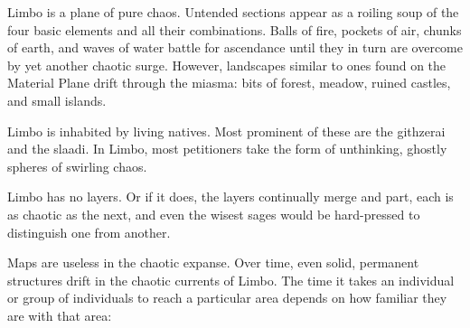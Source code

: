 Limbo is a plane of pure chaos. Untended sections appear as a roiling soup of the four basic elements and all their combinations. Balls of fire, pockets of air, chunks of earth, and waves of water battle for ascendance until they in turn are overcome by yet another chaotic surge. However, landscapes similar to ones found on the Material Plane drift through the miasma: bits of forest, meadow, ruined castles, and small islands.

Limbo is inhabited by living natives. Most prominent of these are the githzerai and the slaadi. In Limbo, most petitioners take the form of unthinking, ghostly spheres of swirling chaos.

Limbo has no layers. Or if it does, the layers continually merge and part, each is as chaotic as the next, and even the wisest sages would be hard-pressed to distinguish one from another.

Maps are useless in the chaotic expanse. Over time, even solid, permanent structures drift in the chaotic currents of Limbo. The time it takes an individual or group of individuals to reach a particular area depends on how familiar they are with that area:


